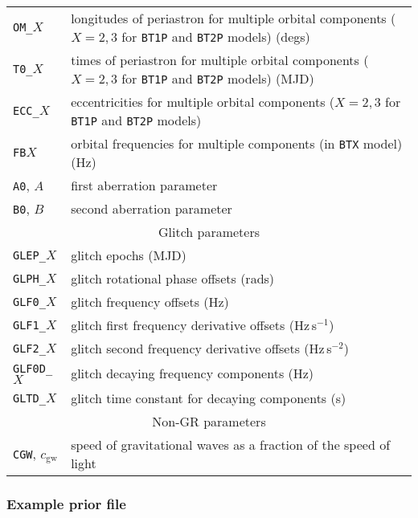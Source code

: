 \begin{longtable}{l|l}
{\tt OM\_}$X$ & longitudes of periastron for multiple orbital components ($X=2,3$ for {\tt BT1P} and {\tt BT2P} models) (degs) \\
{\tt T0\_}$X$ & times of periastron for multiple orbital components ($X=2,3$ for {\tt BT1P} and {\tt BT2P} models) (MJD) \\
{\tt ECC\_}$X$ & eccentricities for multiple orbital components ($X=2,3$ for {\tt BT1P} and {\tt BT2P} models) \\
{\tt FB}$X$ & orbital frequencies for multiple components (in {\tt BTX} model) (Hz) \\
{\tt A0}, $A$ & first aberration parameter \citep[see e.g.\ Section~2.7.3 of][]{2006MNRAS.372.1549E} \\
{\tt B0}, $B$ & second aberration parameter \citep[see e.g.\ Section~2.7.3 of][]{2006MNRAS.372.1549E} \\
\hline
\multicolumn{2}{c}{Glitch parameters \citep[see][]{2006MNRAS.369..655H,2013MNRAS.429..688Y}} \\
\hline
{\tt GLEP\_}$X$ & glitch epochs (MJD) \\
{\tt GLPH\_}$X$ & glitch rotational phase offsets (rads) \\
{\tt GLF0\_}$X$ & glitch frequency offsets (Hz) \\
{\tt GLF1\_}$X$ & glitch first frequency derivative offsets (Hz\,s$^{-1}$) \\
{\tt GLF2\_}$X$ & glitch second  frequency derivative offsets (Hz\,s$^{-2}$) \\
{\tt GLF0D\_}$X$ & glitch decaying frequency components (Hz) \\
{\tt GLTD\_}$X$ & glitch time constant for decaying components (s) \\
\hline
\multicolumn{2}{c}{Non-GR parameters} \\
\hline
{\tt CGW}, $c_{\text{gw}}$ & speed of gravitational waves as a fraction of the speed of light \\
\hline
\hline
\end{longtable}


\subsubsection{Example prior file}\label{sec:priorfile}

